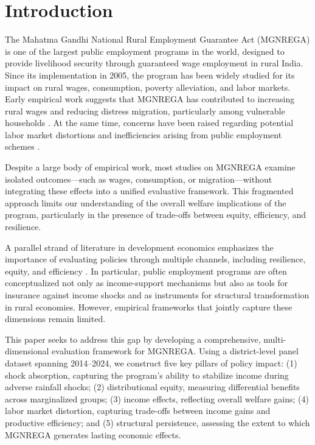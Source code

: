 \documentclass[12pt]{article}
\begin{document}
\newpage
\newpage

\tableofcontents
\newpage

\section{Introduction}

The Mahatma Gandhi National Rural Employment Guarantee Act (MGNREGA) is one of the largest public employment programs in the world, designed to provide livelihood security through guaranteed wage employment in rural India. Since its implementation in 2005, the program has been widely studied for its impact on rural wages, consumption, poverty alleviation, and labor markets. Early empirical work suggests that MGNREGA has contributed to increasing rural wages and reducing distress migration, particularly among vulnerable households \cite{ImbertPapp2015, Berg2012}. At the same time, concerns have been raised regarding potential labor market distortions and inefficiencies arising from public employment schemes \cite{Muralidharan2017}.

Despite a large body of empirical work, most studies on MGNREGA examine isolated outcomes—such as wages, consumption, or migration—without integrating these effects into a unified evaluative framework. This fragmented approach limits our understanding of the overall welfare implications of the program, particularly in the presence of trade-offs between equity, efficiency, and resilience.

A parallel strand of literature in development economics emphasizes the importance of evaluating policies through multiple channels, including resilience, equity, and efficiency \cite{BanerjeeDuflo2011}. In particular, public employment programs are often conceptualized not only as income-support mechanisms but also as tools for insurance against income shocks and as instruments for structural transformation in rural economies. However, empirical frameworks that jointly capture these dimensions remain limited.

This paper seeks to address this gap by developing a comprehensive, multi-dimensional evaluation framework for MGNREGA. Using a district-level panel dataset spanning 2014–2024, we construct five key pillars of policy impact: (1) shock absorption, capturing the program’s ability to stabilize income during adverse rainfall shocks; (2) distributional equity, measuring differential benefits across marginalized groups; (3) income effects, reflecting overall welfare gains; (4) labor market distortion, capturing trade-offs between income gains and productive efficiency; and (5) structural persistence, assessing the extent to which MGNREGA generates lasting economic effects.
\end{document}
